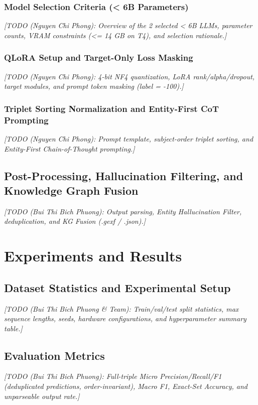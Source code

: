\documentclass[10pt, a4paper]{article}
\newcommand{\todo}[1]{\par\noindent\textit{[#1]}\par}
\begin{document}
\subsubsection{Model Selection Criteria (< 6B Parameters)}
\todo{TODO (Nguyen Chi Phong): Overview of the 2 selected < 6B LLMs, parameter counts, VRAM constraints (<= 14 GB on T4), and selection rationale.}

\subsubsection{QLoRA Setup and Target-Only Loss Masking}
\todo{TODO (Nguyen Chi Phong): 4-bit NF4 quantization, LoRA rank/alpha/dropout, target modules, and prompt token masking (label = -100).}

\subsubsection{Triplet Sorting Normalization and Entity-First CoT Prompting}
\todo{TODO (Nguyen Chi Phong): Prompt template, subject-order triplet sorting, and Entity-First Chain-of-Thought prompting.}

\subsection{Post-Processing, Hallucination Filtering, and Knowledge Graph Fusion}
\todo{TODO (Bui Thi Bich Phuong): Output parsing, Entity Hallucination Filter, deduplication, and KG Fusion (.gexf / .json).}

\section{Experiments and Results}

\subsection{Dataset Statistics and Experimental Setup}
\todo{TODO (Bui Thi Bich Phuong \& Team): Train/val/test split statistics, max sequence lengths, seeds, hardware configurations, and hyperparameter summary table.}

\subsection{Evaluation Metrics}
\todo{TODO (Bui Thi Bich Phuong): Full-triple Micro Precision/Recall/F1 (deduplicated predictions, order-invariant), Macro F1, Exact-Set Accuracy, and unparseable output rate.}
\end{document}
